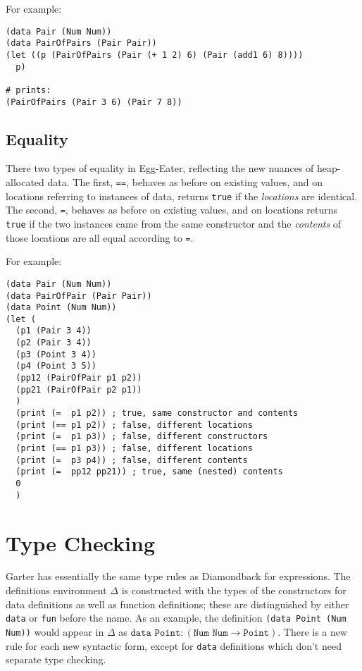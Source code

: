 \documentclass[10pt, oneside]{article}
\begin{document}
For example:

\begin{lstlisting}
(data Pair (Num Num))
(data PairOfPairs (Pair Pair))
(let ((p (PairOfPairs (Pair (+ 1 2) 6) (Pair (add1 6) 8))))
  p)

# prints:
(PairOfPairs (Pair 3 6) (Pair 7 8))
\end{lstlisting}

\subsection*{Equality}

There two types of equality in Egg-Eater, reflecting the new nuances of
heap-allocated data. The first, \texttt{==}, behaves as before on existing
values, and on locations referring to instances of data, returns
\texttt{true} if the \emph{locations} are identical. The second, \texttt{=},
behaves as before on existing values, and on locations returns \texttt{true}
if the two instances came from the same constructor and the \emph{contents}
of those locations are all equal according to \texttt{=}.

For example:

\begin{lstlisting}
(data Pair (Num Num))
(data PairOfPair (Pair Pair))
(data Point (Num Num))
(let (
  (p1 (Pair 3 4))
  (p2 (Pair 3 4))
  (p3 (Point 3 4))
  (p4 (Point 3 5))
  (pp12 (PairOfPair p1 p2))
  (pp21 (PairOfPair p2 p1))
  )
  (print (=  p1 p2)) ; true, same constructor and contents
  (print (== p1 p2)) ; false, different locations
  (print (=  p1 p3)) ; false, different constructors
  (print (== p1 p3)) ; false, different locations
  (print (=  p3 p4)) ; false, different contents
  (print (=  pp12 pp21)) ; true, same (nested) contents
  0
  )
\end{lstlisting}

\section*{Type Checking}

Garter has essentially the same type rules as Diamondback for expressions.
The definitions environment $\Delta$ is constructed with the types of the
constructors for data definitions as well as function definitions; these are
distinguished by either \texttt{data} or \texttt{fun} before the name. As an
example, the definition \texttt{(data Point (Num Num))} would appear in
$\Delta$ as $\texttt{data Point} : (\texttt{Num } \texttt{Num} \rightarrow
\texttt{Point})$. There is a new rule for each new syntactic form, except for
\texttt{data} definitions which don't need separate type checking.
\end{document}

